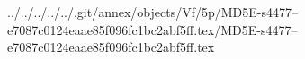 ../../../../../.git/annex/objects/Vf/5p/MD5E-s4477--e7087c0124eaae85f096fc1bc2abf5ff.tex/MD5E-s4477--e7087c0124eaae85f096fc1bc2abf5ff.tex